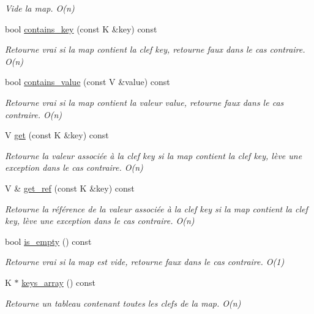 \begin{DoxyCompactItemize}
\begin{DoxyCompactList}\small\item\em Vide la map. O(n) \end{DoxyCompactList}\item 
bool \hyperlink{classmap_a1475d6f92ad4d95e3a6aff213b43ab05}{contains\-\_\-key} (const K \&key) const 
\begin{DoxyCompactList}\small\item\em Retourne vrai si la map contient la clef key, retourne faux dans le cas contraire. O(n) \end{DoxyCompactList}\item 
bool \hyperlink{classmap_a98b7d277ac8857683341302eb9f80445}{contains\-\_\-value} (const V \&value) const 
\begin{DoxyCompactList}\small\item\em Retourne vrai si la map contient la valeur value, retourne faux dans le cas contraire. O(n) \end{DoxyCompactList}\item 
V \hyperlink{classmap_af13c8cde7b550b9f0ba64db7e19b583e}{get} (const K \&key) const 
\begin{DoxyCompactList}\small\item\em Retourne la valeur associée à la clef key si la map contient la clef key, lève une exception dans le cas contraire. O(n) \end{DoxyCompactList}\item 
V \& \hyperlink{classmap_a0d0d9ca0e41b04442b06cef06cd5922e}{get\-\_\-ref} (const K \&key) const 
\begin{DoxyCompactList}\small\item\em Retourne la référence de la valeur associée à la clef key si la map contient la clef key, lève une exception dans le cas contraire. O(n) \end{DoxyCompactList}\item 
bool \hyperlink{classmap_ade9b2f628442a7060eb338d547a4bda5}{is\-\_\-empty} () const 
\begin{DoxyCompactList}\small\item\em Retourne vrai si la map est vide, retourne faux dans le cas contraire. O(1) \end{DoxyCompactList}\item 
K $\ast$ \hyperlink{classmap_a1ca96e037bbebe0705d5e64ef288aaec}{keys\-\_\-array} () const 
\begin{DoxyCompactList}\small\item\em Retourne un tableau contenant toutes les clefs de la map. O(n) \end{DoxyCompactList}\item 

\end{DoxyCompactItemize}
